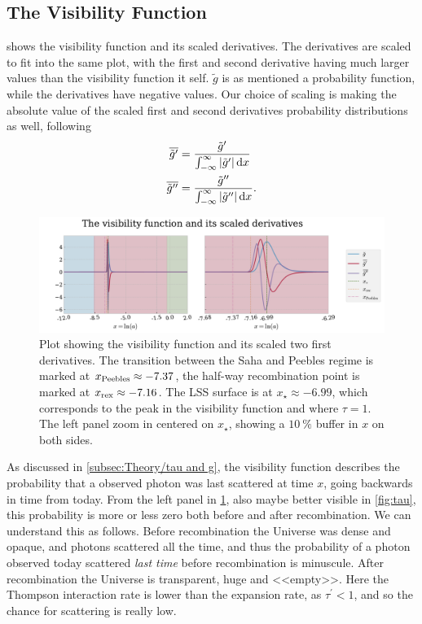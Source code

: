 \documentclass[10pt,a4paper]{article}
\begin{document}
\subsection{The Visibility Function}
\label{subsec:Results/g}
 shows the visibility function and its scaled derivatives. The derivatives are scaled to fit into the same plot, with the first and second derivative having much larger values than the visibility function it self. $\tilde{g}$ is as mentioned a probability function, while the derivatives have negative values. Our choice of scaling is making the absolute value of the scaled first and second derivatives probability distributions as well, following
\begin{align*}
    \overline{\tilde{g}^\prime} &= \frac{\tilde{g}^\prime}{\int_{-\infty}^\infty \abs{\tilde{g}^\prime} \dd{x}}
    \\
    \overline{\tilde{g}^{\prime\prime}} &= \frac{\tilde{g}^{\prime\prime}}{\int_{-\infty}^\infty \abs{\tilde{g}^{\prime\prime}} \dd{x}}.
\end{align*}
\begin{figure}[ht]
    \centering
    \includegraphics[scale=0.5]{../figs/visibility_functions.pdf}
    \caption{Plot showing the visibility function and its scaled two first derivatives. The transition between the Saha and Peebles regime is marked at $x_{\rm{Peebles}}\approx-7.37$, the half-way recombination point is marked at $x_{\rm{rex}}\approx -7.16$. The LSS surface is at $x_\star \approx -6.99$, which corresponds to the peak in the visibility function and where $\tau=1$. The left panel zoom in centered on $x_{\star}$, showing a $\SI{10}{\%}$ buffer in $x$ on both sides.}
    \label{fig:g}
\end{figure}
As discussed in \cref{subsec:Theory/tau and g}, the visibility function describes the probability that a observed photon was last scattered at time $x$, going backwards in time from today. From the left panel in \cref{fig:g}, also maybe better visible in \cref{fig:tau}, this probability is more or less zero both before and after recombination. We can understand this as follows. Before recombination the Universe was dense and opaque, and photons scattered all the time, and thus the probability of a photon observed today scattered \textit{last time} before recombination is minuscule. After recombination the Universe is transparent, huge and <<empty>>. Here the Thompson interaction rate is lower than the expansion rate, as $\tau^\prime < 1$, and so the chance for scattering is really low.
\end{document}
